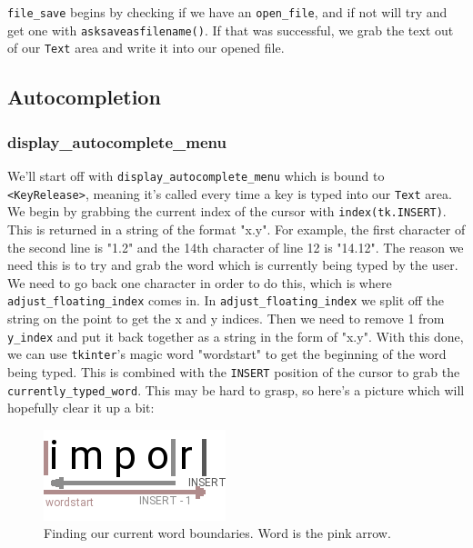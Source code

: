 \documentclass[a4paper,11pt,openany]{book}
\begin{document}
\vspace{5mm}

\lstinline[columns=fixed]{file_save} begins by checking if we have an \lstinline[columns=fixed]{open_file}, and if not will try and get one with \lstinline[columns=fixed]{asksaveasfilename()}. If that was successful, we grab the text out of our \lstinline[columns=fixed]{Text} area and write it into our opened file.

\subsection{Autocompletion}

\subsubsection{display\_autocomplete\_menu}

We'll start off with \lstinline[columns=fixed]{display_autocomplete_menu} which is bound to \lstinline[columns=fixed]{<KeyRelease>}, meaning it's called every time a key is typed into our \lstinline[columns=fixed]{Text} area. We begin by grabbing the current index of the cursor with \lstinline[columns=fixed]{index(tk.INSERT)}. This is returned in a string of the format "x.y". For example, the first character of the second line is "1.2" and the 14th character of line 12 is "14.12". The reason we need this is to try and grab the word which is currently being typed by the user. We need to go back one character in order to do this, which is where \lstinline[columns=fixed]{adjust_floating_index} comes in. In \lstinline[columns=fixed]{adjust_floating_index} we split off the string on the point to get the x and y indices. Then we need to remove 1 from \lstinline[columns=fixed]{y_index} and put it back together as a string in the form of "x.y". With this done, we can use \lstinline[columns=fixed]{tkinter}'s magic word "wordstart" to get the beginning of the word being typed. This is combined with the \lstinline[columns=fixed]{INSERT} position of the cursor to grab the \lstinline[columns=fixed]{currently_typed_word}. This may be hard to grasp, so here's a picture which will hopefully clear it up a bit:

\begin{figure}[h]
\centering
\includegraphics{Ch6-ws}
\caption{Finding our current word boundaries. Word is the pink arrow.}
\end{figure}
\end{document}
